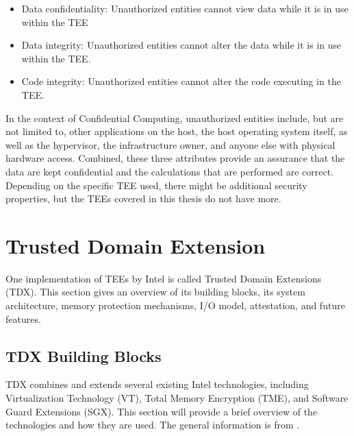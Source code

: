\begin{itemize} 
    \item \guillemotright Data confidentiality: Unauthorized entities cannot view data while it is in use within the TEE
    \item Data integrity: Unauthorized entities cannot alter the data while it is in use within the TEE.
    \item Code integrity: Unauthorized entities cannot alter the code executing in the TEE.\guillemotleft \cite{noauthor_ccc_outreach_whitepaper_updated_november_2022pdf_2023}
\end{itemize} 
In the context of Confidential Computing, unauthorized entities include, but are not limited to, other applications on the host, the host operating system itself, as well as the hypervisor, the infrastructure owner, and anyone else with physical hardware access. 
Combined, these three attributes provide an assurance that the data are kept confidential and the calculations that are performed are correct.
Depending on the specific TEE used, there might be additional security properties, but the TEEs covered in this thesis do not have more\cite{noauthor_ccc_outreach_whitepaper_updated_november_2022pdf_2023}.
\section{Trusted Domain Extension}
One implementation of TEEs by Intel is called Trusted Domain Extensions (TDX). This section gives an overview of its building blocks, its system architecture, memory protection mechanisms, I/O model, attestation, and future features.
\subsection{TDX Building Blocks}
\label{sec:tdxBuildingBlocks}
TDX combines and extends several existing Intel technologies, including Virtualization Technology (VT), Total Memory Encryption (TME), and Software Guard Extensions (SGX). This section will provide a brief overview of the technologies and how they are used. The general information is from \cite{cheng_intel_2023}.
